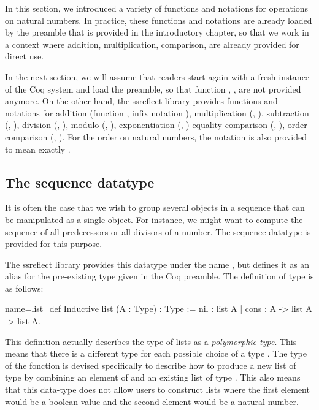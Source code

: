 In this section, we introduced a variety of functions and notations
for operations on natural numbers.  In practice, these functions and
notations are already loaded by the preamble that is provided in the
introductory chapter, so that we work in a context where addition,
multiplication, comparison, are already provided for direct use.

In
the next section, we will assume that readers start again with 
a fresh instance of the Coq system and load the preamble, so that
function , ,  are not provided
anymore.  On the other hand, the ssreflect library provides functions
and notations for addition (function , infix
notation \C{+}), multiplication
(, \C{*}), subtraction (, \C{-}), division (,
\C{\%/}),  modulo (, \C{\%\%}), exponentiation (, \C{\^})
equality comparison (, \C{==}), order
 comparison (, \C{<=}).  For the order on natural numbers,
the notation  is also provided to mean exactly .


\subsection{The sequence datatype}
It is often the case that we wish to group several objects in a
sequence that can be manipulated as a single object.  For instance, we
might want to compute the sequence of all predecessors or all divisors
of a number.  The sequence datatype is provided for this purpose.

The ssreflect library provides this datatype under the name ,
but defines it as an alias for the pre-existing type  given in the
Coq preamble.  The definition of type  is as follows:

\begin{coq}{name=list_def}{}
Inductive list (A : Type) : Type :=
  nil : list A
| cons : A -> list A -> list A.
\end{coq}
This definition actually describes the type of lists as a {\em
  polymorphic type}.  This means that there is a different type
 for each possible choice of a type .  The type of the
fonction  is devised specifically to describe how to produce a
new list of type  by combining an element of  and an
existing list of type .  This also means that this data-type
does not allow users to construct lists where the first element would be
a boolean value and the second element would be a natural number.


